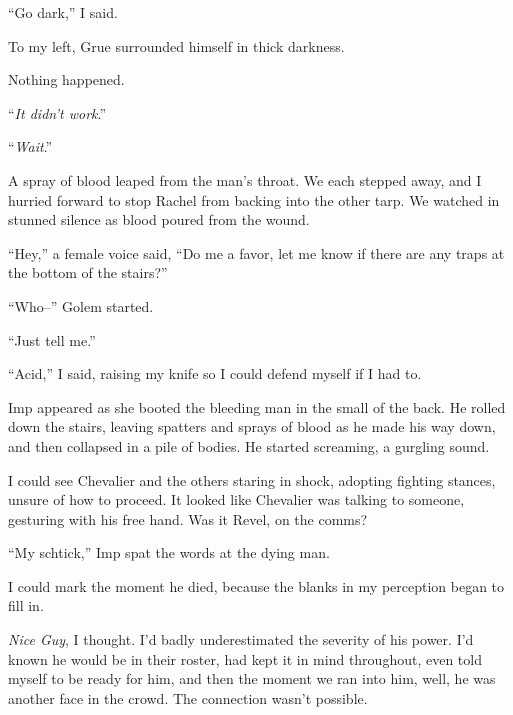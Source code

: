 ``Go dark,'' I said.



To my left, Grue surrounded himself in thick darkness.



Nothing happened.



``\emph{It didn't work}.''



``\emph{Wait}.''



A spray of blood leaped from the man's throat.  We each stepped away, and I hurried forward to stop Rachel from backing into the other tarp.  We watched in stunned silence as blood poured from the wound.



``Hey,'' a female voice said, ``Do me a favor, let me know if there are any traps at the bottom of the stairs?''



``Who--'' Golem started.



``Just tell me.''



``Acid,'' I said, raising my knife so I could defend myself if I had to.



Imp appeared as she booted the bleeding man in the small of the back.  He rolled down the stairs, leaving spatters and sprays of blood as he made his way down, and then collapsed in a pile of bodies.  He started screaming, a gurgling sound.



I could see Chevalier and the others staring in shock, adopting fighting stances, unsure of how to proceed.  It looked like Chevalier was talking to someone, gesturing with his free hand.  Was it Revel, on the comms?



``My schtick,'' Imp spat the words at the dying man.



I could mark the moment he died, because the blanks in my perception began to fill in.



\emph{Nice Guy}, I thought.  I'd badly underestimated the severity of his power.  I'd known he would be in their roster, had kept it in mind throughout, even told myself to be ready for him, and then the moment we ran into him, well, he was another face in the crowd.  The connection wasn't possible.



